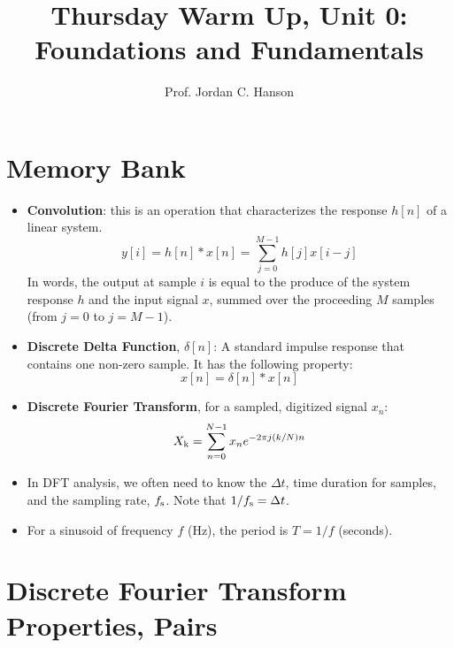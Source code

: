 \documentclass{article}
\begin{document}
\twocolumn

\title{Thursday Warm Up, Unit 0: Foundations and Fundamentals}
\author{Prof. Jordan C. Hanson}
\maketitle

\section{Memory Bank}
\small
\begin{itemize}
\item \textbf{Convolution}: this is an operation that characterizes the response $h[n]$ of a linear system.
\begin{equation}
y[i] = h[n] * x[n] = \sum_{j=0}^{M-1}h[j]x[i-j] \label{eq:conv}
\end{equation}
In words, the output at sample $i$ is equal to the produce of the system response $h$ and the input signal $x$, summed over the proceeding $M$ samples (from $j=0$ to $j=M-1$).
\item \textbf{Discrete Delta Function}, $\delta[n]$: A standard impulse response that contains one non-zero sample.  It has the following property:
\begin{equation}
x[n] = \delta[n] * x[n] \label{eq:conv2}
\end{equation}
\item \textbf{Discrete Fourier Transform}, for a sampled, digitized signal $x_n$:
\begin{equation}
X_{\rm k} = \sum_{n=0}^{N-1} x_n e^{-2\pi j (k/N) n}
\end{equation}
\item In DFT analysis, we often need to know the $\Delta t$, time duration for samples, and the sampling rate, $f_{\rm s}$.  Note that $1/f_{\rm s} = \Delta t$.
\item For a sinusoid of frequency $f$ (Hz), the period is $T = 1/f$ (seconds).
\end{itemize}

\section{Discrete Fourier Transform Properties, Pairs}
\end{document}
